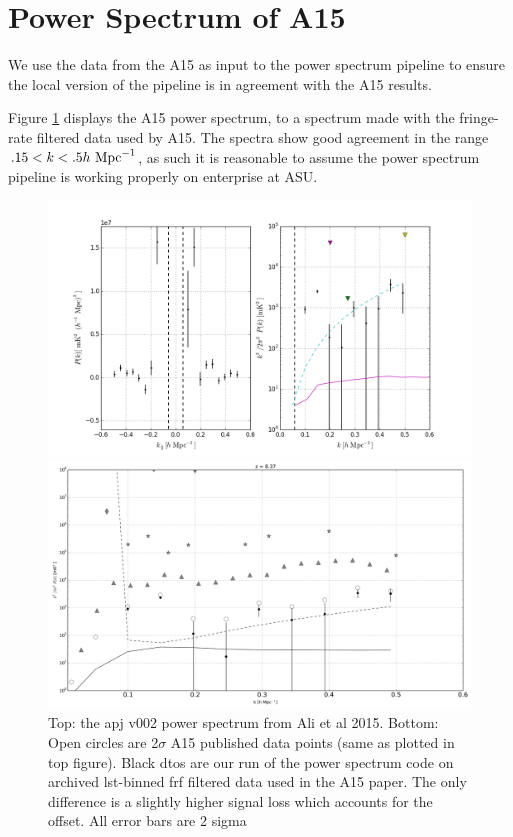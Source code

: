 \documentclass[onecolumn]{emulateapj}
\newcommand{\hMpci}{h\ {\rm Mpc}^{-1}}
\begin{document}
\section{Power Spectrum of A15}{

We use the data from the A15 as input to the power spectrum pipeline to ensure the local version of the pipeline is in agreement with the A15 results.

Figure \ref{fig:compare_apj} displays the A15 power spectrum, to a spectrum made with the fringe-rate filtered data used by A15. The spectra show good agreement in the range $.15< k< .5 \hMpci $, as such it is reasonable to assume the power spectrum pipeline is working properly on enterprise at ASU.


\begin{figure}[h]
\centering
\includegraphics[width=.6\textwidth]{data/ali_et_al_pspec.png}

\includegraphics[width=.5\textwidth]{data/pspec_Mar14_vanilla_ali_apj_frf_95_115_I_comparison.png}
\caption{\label{fig:compare_apj} Top: the apj v002 power spectrum from Ali et al 2015. Bottom: Open circles are 2$\sigma$ A15 published data points (same as plotted in top figure). Black dtos are our run of the power spectrum code on archived lst-binned frf filtered data used in the A15 paper. The only difference is a slightly higher signal loss which accounts for the offset. All error bars are 2 sigma}
\end{figure}
}
\end{document}
